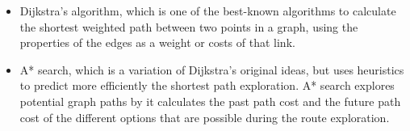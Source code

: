 \begin{itemize}
\item Dijkstra's algorithm\citep{cormen09}, which is one of the best-known algorithms to calculate the shortest weighted path between two points in a graph, using the properties of the edges as a weight or costs of that link.
\item A* search\citep{russel10}, which is a variation of Dijkstra's original ideas, but uses heuristics to predict more efficiently the shortest path exploration. A* search explores potential graph paths by it calculates the past path cost and the future path cost of the different options that are possible during the route exploration. 
\end{itemize}






